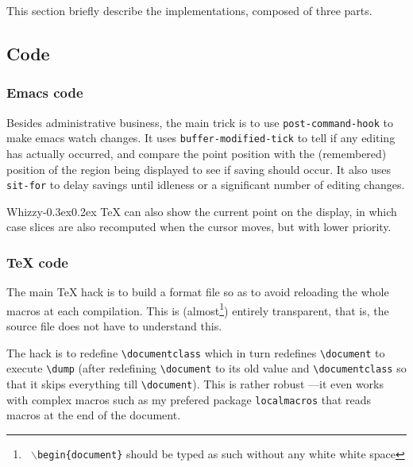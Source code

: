 \documentclass{article}
\let \lst \verb
\def \whizzy{{Whizzy\kern -0.3ex\raise 0.2ex \hbox{\TeX}}}
\begin{document}
This section briefly describe the implementations, composed of three parts.

\subsection {Code} 

\subsubsection* {Emacs code}

Besides administrative business, the main trick is to use 
\lst"post-command-hook" to make emacs watch changes. 
It uses \lst"buffer-modified-tick" to tell if any editing has actually
occurred, and compare the point position with the (remembered) position of
the region being displayed to see if saving should occur. It also uses
\lst"sit-for" to delay savings until idleness or a 
significant number of editing changes. 

{\whizzy} can also show the current point on the display, in which case
slices are also recomputed when the cursor moves, but with lower priority.

\subsubsection* {TeX code}

The main TeX hack is to build a format file so as to avoid reloading the
whole macros at each compilation. This is (almost\footnote{{\tt
$\backslash$begin\{document\}} should be typed as such without any white
white space}) entirely transparent, that is, the source file does not have
to understand this.

The hack is to redefine \lst"\documentclass" which in turn  redefines
\lst"\document" to execute \lst"\dump" (after redefining \lst"\document"
to its old value and \lst"\documentclass" so that it skips everything till
\lst"\document"). This is rather robust ---it even works with 
complex macros such as my prefered package \lst"localmacros" that reads
macros at the end of the document.
\end{document}

